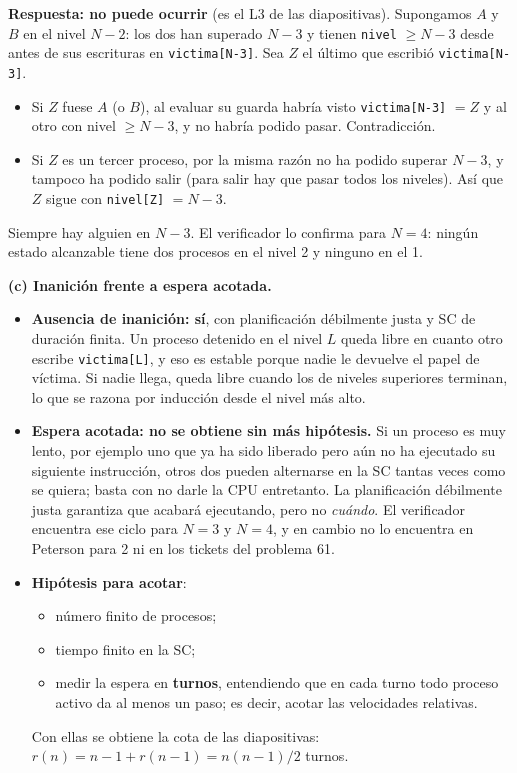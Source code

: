 \begin{solucion}
\textbf{Respuesta: no puede ocurrir} (es el L3 de las diapositivas). Supongamos $A$ y $B$ en el nivel $N - 2$:
los dos han superado $N - 3$ y tienen \texttt{nivel} $\ge N-3$ desde antes de sus escrituras en
\texttt{victima[N-3]}. Sea $Z$ el último que escribió \texttt{victima[N-3]}.
\begin{itemize}[leftmargin=*,noitemsep]
  \item Si $Z$ fuese $A$ (o $B$), al evaluar su guarda habría visto \texttt{victima[N-3]} $= Z$ y al otro con
        nivel $\ge N - 3$, y no habría podido pasar. Contradicción.
  \item Si $Z$ es un tercer proceso, por la misma razón no ha podido superar $N - 3$, y tampoco ha podido salir
        (para salir hay que pasar todos los niveles). Así que $Z$ sigue con \texttt{nivel[Z]} $= N - 3$.
\end{itemize}
Siempre hay alguien en $N-3$. El verificador lo confirma para $N = 4$: ningún estado alcanzable tiene dos procesos
en el nivel 2 y ninguno en el 1.

\textbf{(c) Inanición frente a espera acotada.}
\begin{itemize}[leftmargin=*]
  \item \textbf{Ausencia de inanición: sí}, con planificación débilmente justa y SC de duración finita. Un proceso
        detenido en el nivel $L$ queda libre en cuanto otro escribe \texttt{victima[L]}, y eso es estable porque
        nadie le devuelve el papel de víctima. Si nadie llega, queda libre cuando los de niveles superiores
        terminan, lo que se razona por inducción desde el nivel más alto.
  \item \textbf{Espera acotada: no se obtiene sin más hipótesis.} Si un proceso es muy lento, por ejemplo uno que
        ya ha sido liberado pero aún no ha ejecutado su siguiente instrucción, otros dos pueden alternarse en la
        SC tantas veces como se quiera; basta con no darle la CPU entretanto. La planificación débilmente justa
        garantiza que acabará ejecutando, pero no \emph{cuándo}. El verificador encuentra ese ciclo para $N = 3$
        y $N = 4$, y en cambio no lo encuentra en Peterson para 2 ni en los tickets del problema 61.
  \item \textbf{Hipótesis para acotar}:
        \begin{itemize}[leftmargin=*,noitemsep]
          \item número finito de procesos;
          \item tiempo finito en la SC;
          \item medir la espera en \textbf{turnos}, entendiendo que en cada turno todo proceso activo da al menos un
                paso; es decir, acotar las velocidades relativas.
        \end{itemize}
        Con ellas se obtiene la cota de las diapositivas: $r(n) = n - 1 + r(n-1) = n(n-1)/2$ turnos.
\end{itemize}
\end{solucion}

